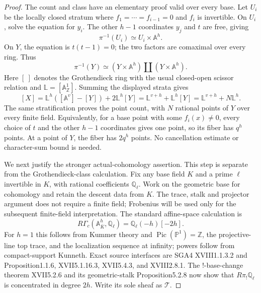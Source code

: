 \begin{proof}
The count and class have an elementary proof valid over every base. Let $U_i$ be the locally closed stratum where $f_1=\cdots=f_{i-1}=0$ and $f_i$ is invertible. On $U_i$, solve the equation for $y_i$. The other $h-1$ coordinates $y_j$ and $t$ are free, giving
\[
             \pi^{-1}(U_i)\simeq U_i\times\mathbb A^h.
\]
On $Y$, the equation is $t(t-1)=0$; the two factors are comaximal over every ring. Thus
\[
             \pi^{-1}(Y)\simeq
                   (Y\times\mathbb A^h)\coprod(Y\times\mathbb A^h).
\]
Here $[\ ]$ denotes the Grothendieck ring with the usual closed-open scissor relation and $\mathbb L=[\mathbb A^1_\mathbb Z]$. Summing the displayed strata gives
\[
 [X]=\mathbb L^h([\mathbb A^v]-[Y])+2\mathbb L^h[Y]
     =\mathbb L^{v+h}+\mathbb L^h[Y]
     =\mathbb L^{v+h}+N\mathbb L^h.
\]
The same stratification proves the point count, with $N$ rational points of $Y$ over every finite field. Equivalently, for a base point with some $f_i(x)\ne0$, every choice of $t$ and the other $h-1$ coordinates gives one point, so its fiber has $q^h$ points. At a point of $Y$, the fiber has $2q^h$ points. No cancellation estimate or character-sum bound is needed.

We next justify the stronger actual-cohomology assertion. This step is separate from the Grothendieck-class calculation. Fix any base field $K$ and a prime $\ell$ invertible in $K$, with rational coefficients $\mathbb Q_\ell$. Work on the geometric base for cohomology and retain the descent data from $K$. The trace, stalk and projector argument does not require a finite field; Frobenius will be used only for the subsequent finite-field interpretation. The standard affine-space calculation is
\[
 R\Gamma_c(\mathbb A^h_{\overline K},\mathbb Q_\ell)
                   =\mathbb Q_\ell(-h)[-2h].
\]
For $h=1$ this follows from Kummer theory and $\operatorname{Pic}(\mathbb P^1)=\mathbb Z$, the projective-line top trace, and the localization sequence at infinity; powers follow from compact-support Kunneth. Exact source interfaces are SGA4 XVIII1.1.3.2 and Proposition1.1.6, XVII5.1.16.3, XVII5.4.3, and XVIII2.8.1. The !-base-change theorem XVII5.2.6 and its geometric-stalk Proposition5.2.8 now show that $R\pi_!\mathbb Q_\ell$ is concentrated in degree $2h$. Write its sole sheaf as $\mathcal T$.


\end{proof}
